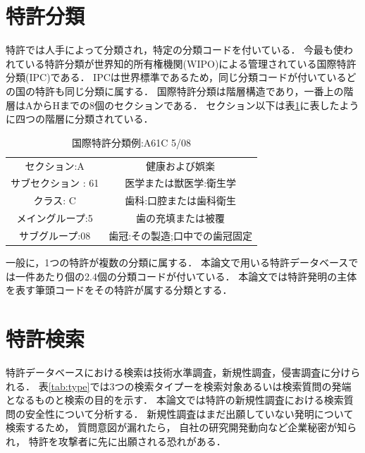 \documentclass[master]{suribt}
\theoremstyle{definition}
\begin{document}
 \section{特許分類}
 特許では人手によって分類され，特定の分類コードを付いている．
 今最も使われている特許分類が世界知的所有権機関(WIPO)による管理されている国際特許分類(IPC)である．
 IPCは世界標準であるため，同じ分類コードが付いているどの国の特許も同じ分類に属する．
 国際特許分類は階層構造であり，一番上の階層はAからHまでの8個のセクションである．
 セクション以下は表\ref{tab:IPC}に表したように四つの階層に分類されている．
 
 \begin{table}[!hbp]
 \center
 \begin{tabular}{cc}
    セクション:A & 健康および娯楽 \\
    サブセクション : 61 & 医学または獣医学:衛生学 \\
    クラス: C & 歯科:口腔または歯科衛生 \\
    メイングループ:5 & 歯の充填または被覆 \\
    サブグループ:08 & 歯冠:その製造;口中での歯冠固定 \\
 \end{tabular}
 \caption{国際特許分類例:A61C 5/08}
 \label{tab:IPC}
 \end{table}
 
 一般に，1つの特許が複数の分類に属する．
 本論文で用いる特許データベースでは一件あたり個の2.4個の分類コードが付いている．
 本論文では特許発明の主体を表す筆頭コードをその特許が属する分類とする．
 
 \section{特許検索}
 特許データベースにおける検索は技術水準調査，新規性調査，侵害調査に分けられる．
 表\ref{tab:type}では3つの検索タイプーを検索対象あるいは検索質問の発端となるものと検索の目的を示す．
 本論文では特許の新規性調査における検索質問の安全性について分析する．
 新規性調査はまだ出願していない発明について検索するため，
 質問意図が漏れたら，
 自社の研究開発動向など企業秘密が知られ，
 特許を攻撃者に先に出願される恐れがある．
 
\end{document}
